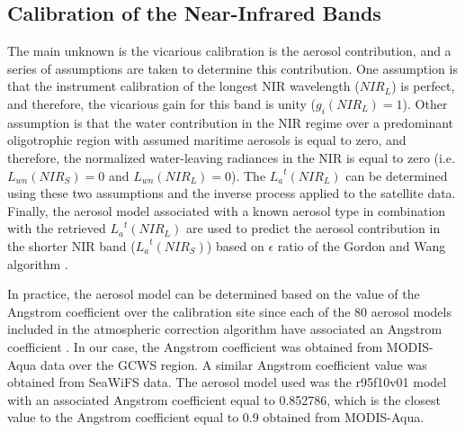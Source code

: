 \documentclass[10pt]{article}
\begin{document}
\subsection{Calibration of the Near-Infrared Bands}
The main unknown is the vicarious calibration is the aerosol contribution, and a series of assumptions are taken to determine this contribution.
One assumption is that the instrument calibration of the longest NIR wavelength ($NIR_L$) is perfect, and therefore, the vicarious gain for this band is unity ($g_i(NIR_L)=1$). 
Other assumption is that the water contribution in the NIR regime over a predominant oligotrophic region with assumed maritime aerosols is equal to zero, and therefore, the normalized water-leaving radiances in the NIR is equal to zero (i.e. $L_{wn}(NIR_S)=0$ and $L_{wn}(NIR_L)=0$).
The ${L_a}^t(NIR_L)$ can be determined using these two assumptions and the inverse process applied to the satellite data.
Finally, the aerosol model associated with a known aerosol type in combination with the retrieved ${L_a}^t(NIR_L)$ are used to predict the aerosol contribution in the shorter NIR band (${L_a}^t(NIR_S)$) based on $\epsilon$ ratio of the Gordon and Wang algorithm \cite{Gordon1994}.


In practice, the aerosol model can be determined based on the value of the Angstrom coefficient over the calibration site since each of the 80 aerosol models included in the atmospheric correction algorithm have associated an Angstrom coefficient \cite{Mobley2016,Ahmad2010}.
In our case, the Angstrom coefficient was obtained from MODIS-Aqua data over the GCWS region. 
A similar Angstrom coefficient value was obtained from SeaWiFS data. 
The aerosol model used was the r95f10v01 model with an associated Angstrom coefficient equal to 0.852786, which is the closest value to the Angstrom coefficient equal to 0.9 obtained from MODIS-Aqua.
\end{document}

